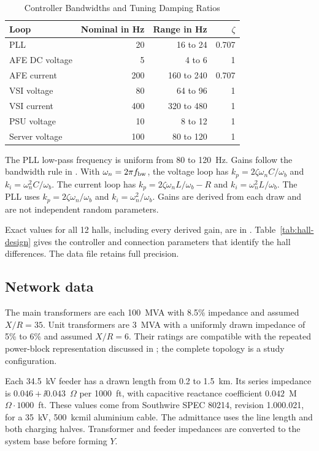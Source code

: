 \begin{table}[H]
\centering
\caption{Controller Bandwidths and Tuning Damping Ratios}
\begin{tabular}{lrrr}
\toprule
Loop & Nominal in Hz & Range in Hz & $\zeta$\\\midrule
PLL & 20 & 16 to 24 & 0.707\\
AFE DC voltage & 5 & 4 to 6 & 1\\
AFE current & 200 & 160 to 240 & 0.707\\
VSI voltage & 80 & 64 to 96 & 1\\
VSI current & 400 & 320 to 480 & 1\\
PSU voltage & 10 & 8 to 12 & 1\\
Server voltage & 100 & 80 to 120 & 1\\\bottomrule
\end{tabular}
\end{table}
The PLL low-pass frequency is uniform from 80 to 120~Hz.
Gains follow the bandwidth rule in \cite{zhao2026dynamic}.
With $\omega_n=2\pi f_{\rm bw}$, the voltage loop has $k_p=2\zeta\omega_n C/\omega_b$ and $k_i=\omega_n^2 C/\omega_b$.
The current loop has $k_p=2\zeta\omega_n L/\omega_b-R$ and $k_i=\omega_n^2 L/\omega_b$.
The PLL uses $k_p=2\zeta\omega_n/\omega_b$ and $k_i=\omega_n^2/\omega_b$.
Gains are derived from each draw and are not independent random parameters.

Exact values for all 12 halls, including every derived gain, are in .
Table~\ref{tab:hall-design} gives the controller and connection parameters that identify the hall differences.
The data file retains full precision.


\subsection{Network data}
The main transformers are each 100~MVA with 8.5\% impedance and assumed $X/R=35$.
Unit transformers are 3~MVA with a uniformly drawn impedance of 5\% to 6\% and assumed $X/R=6$.
Their ratings are compatible with the repeated power-block representation discussed in \cite{ross2025emt}; the complete topology is a study configuration.

Each 34.5~kV feeder has a drawn length from 0.2 to 1.5~km.
Its series impedance is $0.046+\ii0.043$~$\Omega$ per 1000~ft, with capacitive reactance coefficient $0.042$~M$\Omega\cdot1000$~ft.
These values come from Southwire SPEC 80214, revision 1.000.021, for a 35~kV, 500~kcmil aluminium cable.
The admittance uses the line length and both charging halves.
Transformer and feeder impedances are converted to the system base before forming $Y$.

